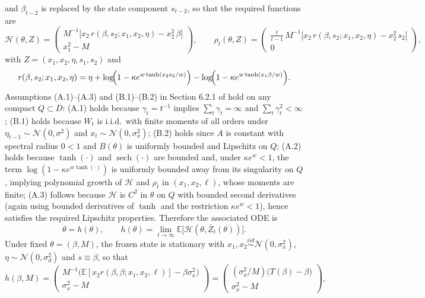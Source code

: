 \documentclass[11pt]{article}
\DeclareMathOperator*{\sech}{sech}
\begin{document}
and $\beta_{t-2}$ is replaced by the state component $s_{t-2}$, so that the required functions are
\[
\mathcal H(\theta,Z)=
\begin{pmatrix}
M^{-1}\big[x_{2}\,r(\beta,s_{2};x_1,x_2,\eta)-x_2^2\,\beta\big]\\
x_1^2-M
\end{pmatrix},
\qquad
\rho_t(\theta,Z)=
\begin{pmatrix}
\frac{t}{t-1}\,M^{-1}\big[x_{2}\,r(\beta,s_{2};x_1,x_2,\eta)-x_2^2\,s_{2}\big]\\
0
\end{pmatrix},
\]
with $Z=(x_1,x_2,\eta,s_1, s_2)$ and
\[
r(\beta,s_2;x_1,x_2,\eta)
=\eta+\log\!\Bigl(1-\kappa e^{w\tanh(x_2 s_2/w)}\Bigr)-\log\!\Bigl(1-\kappa e^{w\tanh(x_1 \beta/w)}\Bigr).
\]
Assumptions (A.1)–(A.3) and (B.1)–(B.2) in Section 6.2.1 of \cite{GeorgeWEvans2001} hold on any compact $Q\subset D$: (A.1) holds because $\gamma_t=t^{-1}$ implies $\sum_t\gamma_t=\infty$ and $\sum_t\gamma_t^2<\infty$; 
(B.1) holds because $W_t$ is i.i.d.\ with finite moments of all orders under $\eta_{t-1}\sim\mathcal N(0,\sigma^2)$ and $x_t\sim \mathcal N(0,\sigma_x^2)$; (B.2) holds since $A$ is constant with spectral radius $0<1$ and $B(\theta)$ is uniformly bounded and Lipschitz on $Q$; (A.2) holds because $\tanh(\cdot)$ and $\sech(\cdot)$ are bounded and, under $\kappa e^{w}<1$, the term $\log(1-\kappa e^{w\tanh(\cdot)})$ is uniformly bounded away from its singularity on $Q$, implying polynomial growth of $\mathcal H$ and $\rho_t$ in $(x_1,x_2,\ell)$, whose moments are finite; (A.3) follows because $\mathcal H$ is $C^2$ in $\theta$ on $Q$ with bounded second derivatives (again using bounded derivatives of $\tanh$ and the restriction $\kappa e^{w}<1$), hence satisfies the required Lipschitz properties. Therefore the associated ODE is
\[
\dot\theta = h(\theta),\qquad h(\theta)=\lim_{t\to\infty}\mathbb E\big[\mathcal H(\theta,\bar Z_t(\theta))\big].
\]
Under fixed $\theta=(\beta,M)$, the frozen state is stationary with $x_1,x_2\stackrel{iid}{\sim}\mathcal N(0,\sigma_x^2)$, $\eta\sim\mathcal N(0,\sigma_d^2)$ and $s\equiv \beta$, so that
\[
h(\beta,M)=
\begin{pmatrix}
M^{-1}\big(\mathbb E[x_2 r(\beta,\beta;x_1,x_2,\ell)]-\beta\sigma_x^2\big)\\
\sigma_x^2-M
\end{pmatrix}
=
\begin{pmatrix}
(\sigma_x^2/M)\big(T(\beta)-\beta\big)\\
\sigma_x^2-M
\end{pmatrix},
\]
\end{document}

